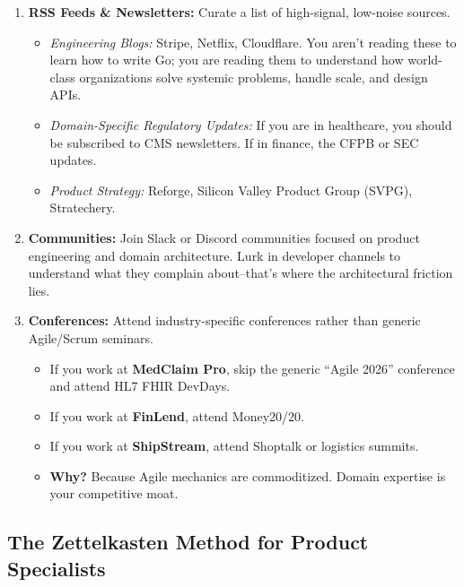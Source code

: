 \documentclass[
  11pt,
  openany,
  oneside]{book}
\providecommand{\tightlist}{%
  \setlength{\itemsep}{0pt}\setlength{\parskip}{0pt}}
\begin{document}
\begin{enumerate}
\def\labelenumi{\arabic{enumi}.}
\tightlist
\item
  \textbf{RSS Feeds \& Newsletters:} Curate a list of high-signal,
  low-noise sources.

  \begin{itemize}
  \tightlist
  \item
    \emph{Engineering Blogs:} Stripe, Netflix, Cloudflare. You aren't
    reading these to learn how to write Go; you are reading them to
    understand how world-class organizations solve systemic problems,
    handle scale, and design APIs.
  \item
    \emph{Domain-Specific Regulatory Updates:} If you are in healthcare,
    you should be subscribed to CMS newsletters. If in finance, the CFPB
    or SEC updates.
  \item
    \emph{Product Strategy:} Reforge, Silicon Valley Product Group
    (SVPG), Stratechery.
  \end{itemize}
\item
  \textbf{Communities:} Join Slack or Discord communities focused on
  product engineering and domain architecture. Lurk in developer
  channels to understand what they complain about--that's where the
  architectural friction lies.
\item
  \textbf{Conferences:} Attend industry-specific conferences rather than
  generic Agile/Scrum seminars.

  \begin{itemize}
  \tightlist
  \item
    If you work at \textbf{MedClaim Pro}, skip the generic ``Agile
    2026'' conference and attend HL7 FHIR DevDays.
  \item
    If you work at \textbf{FinLend}, attend Money20/20.
  \item
    If you work at \textbf{ShipStream}, attend Shoptalk or logistics
    summits.
  \item
    \textbf{Why?} Because Agile mechanics are commoditized. Domain
    expertise is your competitive moat.
  \end{itemize}
\end{enumerate}

\subsection{The Zettelkasten Method for Product
Specialists}\label{the-zettelkasten-method-for-product-specialists}
\end{document}
